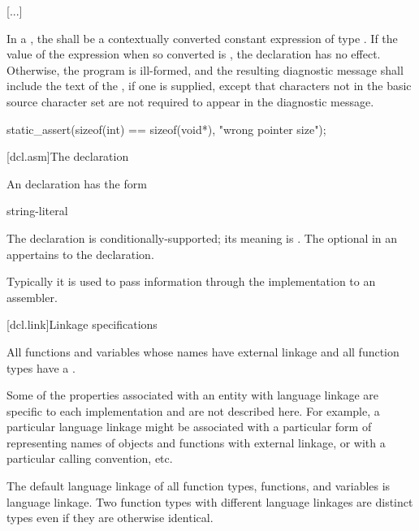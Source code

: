 \documentclass{wg21}
\begin{document}
[...]

\pnum
{}%
In a , the
 shall be
a contextually converted constant expression
of type .
If the value of the expression when
so converted is , the declaration has no
effect. Otherwise, the program is ill-formed, and the resulting
diagnostic message shall include the text of
the , if one is supplied,
except that characters not in the basic
source character set are not required to appear in
the diagnostic message.
\begin{example}
\begin{codeblock}
    static_assert(sizeof(int) == sizeof(void*), "wrong pointer size");
\end{codeblock}\end{example}

[dcl.asm]{The  declaration}%
%
%

\pnum
An  declaration has the form

\begin{bnf}
    \br
      \terminal{(} string-literal \terminal{)} \terminal{;}
\end{bnf}

The  declaration is conditionally-supported; its meaning is
.
The optional  in
an  appertains to the  declaration.
\begin{note}
    Typically it is used to pass information through the implementation to
    an assembler.
\end{note}

[dcl.link]{Linkage specifications}%

\pnum
All functions and variables whose names have external linkage
and all function types
have a .
\begin{note}
    Some of the properties associated with an entity with language linkage
    are specific to each implementation and are not described here. For
    example, a particular language linkage might be associated with a
    particular form of representing names of objects and functions with
    external linkage, or with a particular calling convention, etc.
\end{note}
The default language linkage of all function types, functions, and
variables is \Cpp{} language linkage. Two function types with
different language linkages are distinct types even if they are
otherwise identical.
\end{document}
